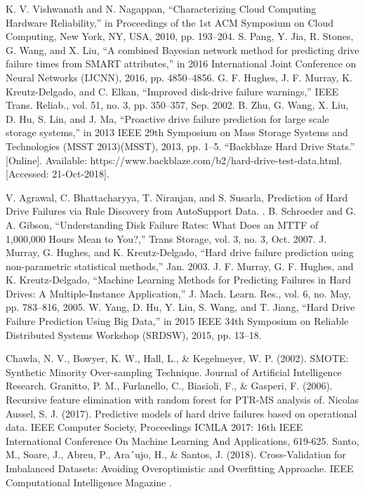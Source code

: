\documentclass[conference]{IEEEtran}
\begin{document}
\begin{thebibliography}{99}

 K. V. Vishwanath and N. Nagappan, “Characterizing Cloud Computing Hardware Reliability,” in Proceedings of the 1st ACM Symposium on Cloud Computing, New York, NY, USA, 2010, pp. 193–204.
 S. Pang, Y. Jia, R. Stones, G. Wang, and X. Liu, “A combined Bayesian network method for predicting drive failure times from SMART attributes,” in 2016 International Joint Conference on Neural Networks (IJCNN), 2016, pp. 4850–4856.
 G. F. Hughes, J. F. Murray, K. Kreutz-Delgado, and C. Elkan, “Improved disk-drive failure warnings,” IEEE Trans. Reliab., vol. 51, no. 3, pp. 350–357, Sep. 2002.
 B. Zhu, G. Wang, X. Liu, D. Hu, S. Lin, and J. Ma, “Proactive drive failure prediction for large scale storage systems,” in 2013 IEEE 29th Symposium on Mass Storage Systems and Technologies (MSST 2013)(MSST), 2013, pp. 1–5.
 “Backblaze Hard Drive Stats.” [Online]. Available: https://www.backblaze.com/b2/hard-drive-test-data.html. [Accessed: 21-Oct-2018].


 V. Agrawal, C. Bhattacharyya, T. Niranjan, and S. Susarla, Prediction of Hard Drive Failures via Rule Discovery from AutoSupport Data. .
 B. Schroeder and G. A. Gibson, “Understanding Disk Failure Rates: What Does an MTTF of 1,000,000 Hours Mean to You?,” Trans Storage, vol. 3, no. 3, Oct. 2007.
J. Murray, G. Hughes, and K. Kreutz-Delgado, “Hard drive failure prediction using non-parametric statistical methods,” Jan. 2003.
 J. F. Murray, G. F. Hughes, and K. Kreutz-Delgado, “Machine Learning Methods for Predicting Failures in Hard Drives: A Multiple-Instance Application,” J. Mach. Learn. Res., vol. 6, no. May, pp. 783–816, 2005.
 W. Yang, D. Hu, Y. Liu, S. Wang, and T. Jiang, “Hard Drive Failure Prediction Using Big Data,” in 2015 IEEE 34th Symposium on Reliable Distributed Systems Workshop (SRDSW), 2015, pp. 13–18.


 Chawla, N. V., Bowyer, K. W., Hall, L., \& Kegelmeyer, W. P. (2002). SMOTE: Synthetic Minority Over-sampling Technique. Journal of Artificial Intelligence Research.
 Granitto, P. M., Furlanello, C., Biasioli, F., \& Gasperi, F. (2006). Recursive feature elimination with random forest for PTR-MS analysis of. 
 Nicolas Aussel, S. J. (2017). Predictive models of hard drive failures based on operational data. IEEE Computer Society, Proceedings ICMLA 2017: 16th IEEE International Conference On Machine Learning And Applications, 619-625.
 Santo, M., Soare, J., Abreu, P., Ara´ujo, H., \& Santos, J. (2018). Cross-Validation for Imbalanced Datasets: Avoiding Overoptimistic and Overfitting Approache. IEEE Computational Intelligence Magazine .




\end{thebibliography}
\end{document}
